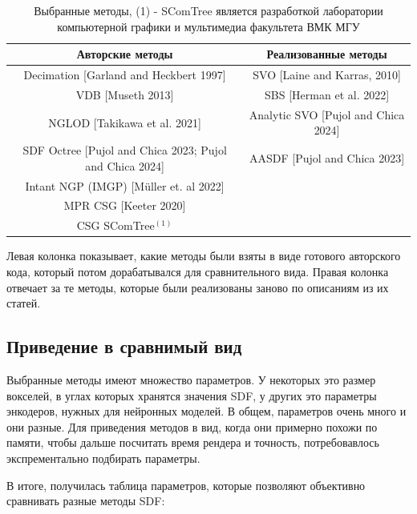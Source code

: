 \documentclass[a4paper,hidelinks,12pt]{article}
\begin{document}
\begin{table}[h!]
	\centering
	\begin{tabular}{|c|c|}
	\hline
	Авторские методы & Реализованные методы \\
	\hline
	Decimation [Garland and Heckbert 1997]   & SVO [Laine and Karras, 2010]  \\
	VDB [Museth 2013]   & SBS [Herman et al. 2022]  \\
	NGLOD [Takikawa et al. 2021] & Analytic SVO [Pujol and Chica 2024] \\
	SDF Octree [Pujol and Chica 2023; Pujol and Chica 2024] & AASDF [Pujol and Chica 2023] \\
	Intant NGP (IMGP) [Müller et. al 2022] & \\
	MPR CSG [Keeter 2020] & \\
	CSG SComTree$^{(1)}$ & \\
	\hline
	\end{tabular}
	\caption{Выбранные методы, (1) - SComTree является разработкой лаборатории компьютерной графики и мультимедиа факультета ВМК МГУ}
	\label{tab:twocol}
	\end{table}

	Левая колонка показывает, какие методы были взяты в виде готового авторского кода, который потом дорабатывался для сравнительного вида. Правая колонка 
	отвечает за те методы, которые были реализованы заново по описаниям из их статей.

\subsection{Приведение в сравнимый вид}

Выбранные методы имеют множество параметров. У некоторых это размер вокселей, в углах которых хранятся значения SDF, у других это параметры энкодеров, нужных для 
нейронных моделей. В общем, параметров очень много и они разные. Для приведения методов в вид, когда они примерно похожи по памяти, чтобы дальше посчитать 
время рендера и точность, потребовавлось экспрементально подбирать параметры. 

В итоге, получилась таблица параметров, которые позволяют объективно сравнивать разные методы SDF:
\end{document}

